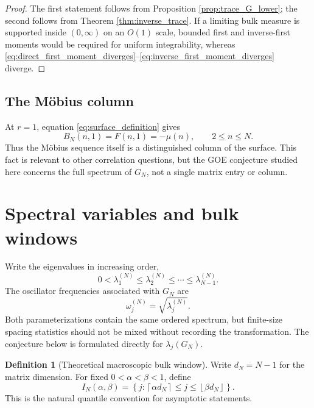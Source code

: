 \documentclass[11pt]{amsart}
\numberwithin{equation}{section}
\theoremstyle{plain}
\theoremstyle{definition}
\newtheorem{definition}[theorem]{Definition}
\theoremstyle{remark}
\newcommand{\mob}{\mu}
\begin{document}
\begin{proof}
The first statement follows from Proposition \ref{prop:trace_G_lower}; the second follows from Theorem \ref{thm:inverse_trace}.  If a limiting bulk measure is supported inside $(0,\infty)$ on an $O(1)$ scale, bounded first and inverse-first moments would be required for uniform integrability, whereas \eqref{eq:direct_first_moment_diverges}--\eqref{eq:inverse_first_moment_diverges} diverge.
\end{proof}

\subsection{The M\"obius column}
\label{subsec:mobius_column}

At $r=1$, equation \eqref{eq:surface_definition} gives
\begin{equation}
B_N(n,1)=F(n,1)=-\mob(n),
\qquad 2\le n\le N.
\label{eq:first_column_mobius}
\end{equation}
Thus the M\"obius sequence itself is a distinguished column of the surface.  This fact is relevant to other correlation questions, but the GOE conjecture studied here concerns the full spectrum of $G_N$, not a single matrix entry or column.

\section{Spectral variables and bulk windows}
\label{sec:spectral_variables}

Write the eigenvalues in increasing order,
\begin{equation}
0<\lambda_1^{(N)}\le\lambda_2^{(N)}\le\cdots\le\lambda_{N-1}^{(N)}.
\label{eq:eigenvalue_order}
\end{equation}
The oscillator frequencies associated with $G_N$ are
\begin{equation}
\omega_j^{(N)}=\sqrt{\lambda_j^{(N)}}.
\label{eq:oscillator_frequency}
\end{equation}
Both parameterizations contain the same ordered spectrum, but finite-size spacing statistics should not be mixed without recording the transformation.  The conjecture below is formulated directly for $\lambda_j(G_N)$.

\begin{definition}[Theoretical macroscopic bulk window]
\label{def:bulk_window}
Write $d_N=N-1$ for the matrix dimension.  For fixed $0<\alpha<\beta<1$, define
\begin{equation}
I_N(\alpha,\beta)
=
\left\{j:\left\lceil\alpha d_N\right\rceil
\le j\le
\left\lfloor\beta d_N\right\rfloor\right\}.
\label{eq:bulk_window}
\end{equation}
This is the natural quantile convention for asymptotic statements.
\end{definition}
\end{document}
